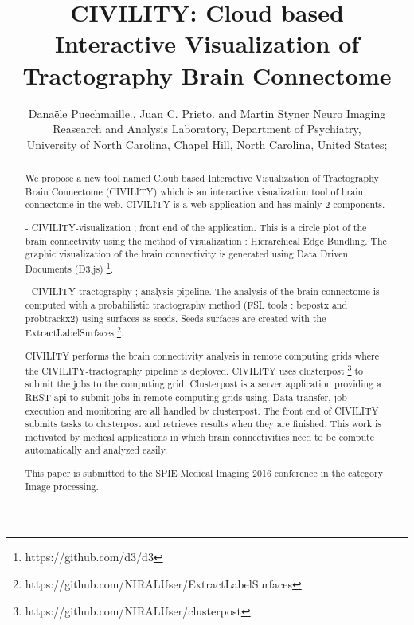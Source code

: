 \documentclass[]{spie}  %
\title{CIVILITY: Cloud based Interactive Visualization of Tractography Brain Connectome}
\author{Dana\"{e}le Puechmaille.\supit{a}, Juan C. Prieto.\supit{a} and Martin Styner\supit{a}
\skiplinehalf
\supit{a}Neuro Imaging Reasearch and Analysis Laboratory, Department of Psychiatry, \\
 University of North Carolina, Chapel Hill, North Carolina, United States;
}
\begin{document}
 
  \maketitle 

\begin{abstract}

We propose a new tool named Cloub based Interactive Visualization of Tractography Brain Connectome (CIVILITY) which is an interactive visualization tool of brain connectome in the web.
CIVILITY is a web application and has mainly 2 components.

- CIVILITY-visualization ; front end of the application. This is a circle plot of the brain connectivity using the method of visualization : Hierarchical Edge Bundling. The graphic visualization of the brain connectivity is generated using Data Driven Documents (D3.js) \footnote{https://github.com/d3/d3}.

- CIVILITY-tractography ; analysis pipeline. The analysis of the brain connectome is computed with a probabilistic tractography method (FSL tools : bepostx and probtrackx2) using surfaces as seeds. Seeds surfaces are created with the ExtractLabelSurfaces \footnote{https://github.com/NIRALUser/ExtractLabelSurfaces}.

CIVILITY performs the brain connectivity analysis in remote computing grids where the CIVILITY-tractography pipeline is deployed. CIVILITY uses clusterpost \footnote{https://github.com/NIRALUser/clusterpost} to submit the jobs to the computing grid. Clusterpost is a server application providing a REST api to submit jobs in remote computing grids using. Data transfer, job execution and monitoring are all handled by clusterpost.
The front end of CIVILITY submits tasks to clusterpost and retrieves results when they are finished.
This work is motivated by medical applications in which brain connectivities need to be compute automatically and analyzed easily.

This paper is submitted to the SPIE Medical Imaging 2016 conference in the category Image processing. 

\end{abstract}



\end{document}
